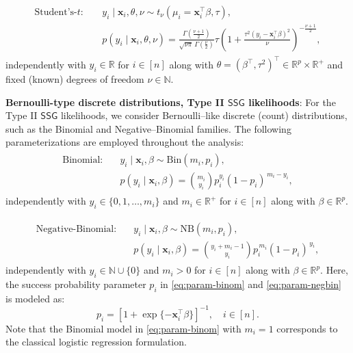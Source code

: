 \documentclass[12pt]{article}
\numberwithin{equation}{section}
\begin{document}
\begin{align}\label{eq:param-student}
    \begin{split}
        \text{Student's-}t: \quad &y_i \mid \mathbf{x}_i, \theta, \nu \sim t_{\nu}(\mu_i = \mathbf{x}_i^{\top}\beta, \tau),\\
        &p(y_i \mid \mathbf{x}_i, \theta, \nu) = 
        \frac{\Gamma\!\left(\frac{\nu + 1}{2}\right)}
        {\sqrt{\nu\pi}\,\Gamma\!\left(\frac{\nu}{2}\right)}\tau
        \left(1 + \frac{\tau^2(y_i - \mathbf{x}_i^{\top}\beta)^{2}}{\nu}\right)^{-\frac{\nu + 1}{2}},
    \end{split}
\end{align}
independently with $y_i\in \mathbb{R}$ for $i\in [n]$ along with $\theta = (\beta^{\top}, \tau^{2})^{\top} \in \mathbb{R}^{p}\times \mathbb{R}^{+}$ and fixed (known) degrees of freedom $\nu \in \mathbb{N}$.
%

\textbf{Bernoulli-type discrete distributions, Type II $\mathsf{SSG}$ likelihoods}: For the Type II $\mathsf{SSG}$ likelihoods, we consider 
Bernoulli–like discrete (count) distributions, such as the Binomial and Negative–Binomial families. The following parameterizations are employed throughout the analysis:
\begin{align}\label{eq:param-binom}
    \begin{split}
        \text{Binomial}: \quad &y_i \mid \mathbf{x}_i, \beta \sim \mathrm{Bin}(m_i, p_i),\\
        & p(y_i\mid \mathbf{x}_i, \beta) = \binom{m_i}{y_i} p_i^{y_i} (1 - p_i)^{\,m_i - y_i},
    \end{split}
\end{align}
independently with $y_i \in \{0,1,\ldots, m_i\}$ and $m_i \in \mathbb{R}^{+}$ for $i\in [n]$ along with $\beta\in \mathbb{R}^{p}$.

\begin{align}\label{eq:param-negbin}
    \begin{split}
        \text{Negative-Binomial}: \quad &y_i\mid \mathbf{x}_i, \beta \sim \mathrm{NB}(m_i, p_i),\\
        & p(y_i\mid \mathbf{x}_i, \beta) = \binom{y_i + m_i - 1}{y_i} p_i^{\,m_i} (1 - p_i)^{\,y_i},
    \end{split}
\end{align}
independently with $y_i \in \mathbb{N} \cup \{0\}$ and $m_i > 0$ for $i\in [n]$ along with $\beta\in \mathbb{R}^{p}$. Here, the success probability parameter $p_i$ in \eqref{eq:param-binom} and \eqref{eq:param-negbin} is modeled as:
$$
p_i = \left[1 + \exp\{-\mathbf{x}_i^{\top}\beta\}\right]^{-1}, \quad i\in [n].
$$
Note that the Binomial model in \eqref{eq:param-binom} with $m_i=1$ corresponds to the classical logistic regression formulation.
%
\end{document}
